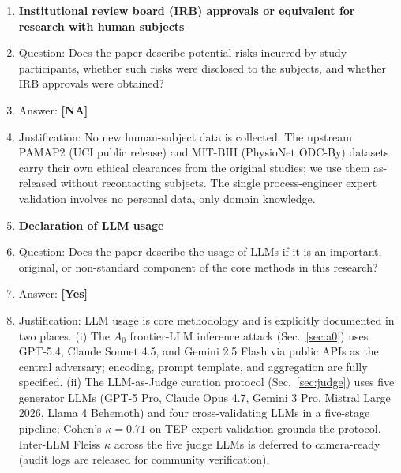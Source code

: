 \documentclass{article}
\theoremstyle{remark}
\begin{document}
\begin{enumerate}
\item {\bf Institutional review board (IRB) approvals or equivalent for research with human subjects}
\item[] Question: Does the paper describe potential risks incurred by study participants, whether such risks were disclosed to the subjects, and whether IRB approvals were obtained?
\item[] Answer: \textbf{[NA]}
\item[] Justification: No new human-subject data is collected. The upstream PAMAP2 (UCI public release) and MIT-BIH (PhysioNet ODC-By) datasets carry their own ethical clearances from the original studies; we use them as-released without recontacting subjects. The single process-engineer expert validation involves no personal data, only domain knowledge.

\item {\bf Declaration of LLM usage}
\item[] Question: Does the paper describe the usage of LLMs if it is an important, original, or non-standard component of the core methods in this research?
\item[] Answer: \textbf{[Yes]}
\item[] Justification: LLM usage is core methodology and is explicitly documented in two places. (i) The $A_0$ frontier-LLM inference attack (Sec.~\ref{sec:a0}) uses GPT-5.4, Claude Sonnet 4.5, and Gemini 2.5 Flash via public APIs as the central adversary; encoding, prompt template, and aggregation are fully specified. (ii) The LLM-as-Judge curation protocol (Sec.~\ref{sec:judge}) uses five generator LLMs (GPT-5 Pro, Claude Opus 4.7, Gemini 3 Pro, Mistral Large 2026, Llama 4 Behemoth) and four cross-validating LLMs in a five-stage pipeline; Cohen's $\kappa = 0.71$ on TEP expert validation grounds the protocol. Inter-LLM Fleiss $\kappa$ across the five judge LLMs is deferred to camera-ready (audit logs are released for community verification).

\end{enumerate}
\end{document}
